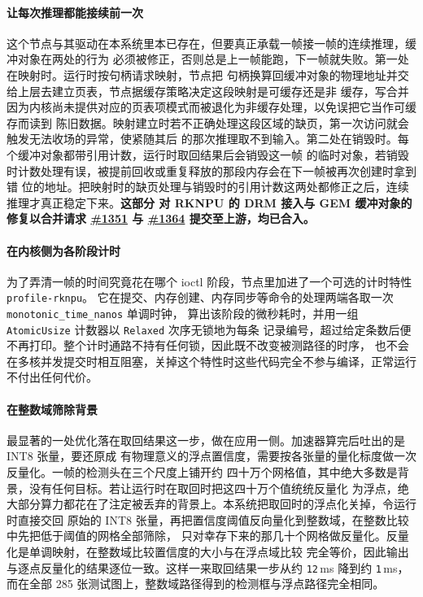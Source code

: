\paragraph{让每次推理都能接续前一次}
这个节点与其驱动在本系统里本已存在，但要真正承载一帧接一帧的连续推理，缓冲对象在两处的行为
必须被修正，否则总是上一帧能跑，下一帧就失败。第一处在映射时。运行时按句柄请求映射，节点把
句柄换算回缓冲对象的物理地址并交给上层去建立页表，节点据缓存策略决定这段映射是可缓存还是非
缓存，写合并因为内核尚未提供对应的页表项模式而被退化为非缓存处理，以免误把它当作可缓存而读到
陈旧数据。映射建立时若不正确处理这段区域的缺页，第一次访问就会触发无法收场的异常，使紧随其后
的那次推理取不到输入。第二处在销毁时。每个缓冲对象都带引用计数，运行时取回结果后会销毁这一帧
的临时对象，若销毁时计数处理有误，被提前回收或重复释放的那段内存会在下一帧被再次创建时拿到错
位的地址。把映射时的缺页处理与销毁时的引用计数这两处都修正之后，连续推理才真正稳定下来。\textbf{这部分
对 RKNPU 的 DRM 接入与 GEM 缓冲对象的修复以合并请求 \href{https://github.com/rcore-os/tgoskits/pull/1351}{\#1351}
与 \href{https://github.com/rcore-os/tgoskits/pull/1364}{\#1364} 提交至上游，均已合入。}

\paragraph{在内核侧为各阶段计时}
为了弄清一帧的时间究竟花在哪个 ioctl 阶段，节点里加进了一个可选的计时特性 \texttt{profile-rknpu}。
它在提交、内存创建、内存同步等命令的处理两端各取一次 \texttt{monotonic\_time\_nanos} 单调时钟，
算出该阶段的微秒耗时，并用一组 \texttt{AtomicUsize} 计数器以 \texttt{Relaxed} 次序无锁地为每条
记录编号，超过给定条数后便不再打印。整个计时通路不持有任何锁，因此既不改变被测路径的时序，
也不会在多核并发提交时相互阻塞，关掉这个特性时这些代码完全不参与编译，正常运行不付出任何代价。

\paragraph{在整数域筛除背景}
最显著的一处优化落在取回结果这一步，做在应用一侧。加速器算完后吐出的是 INT8 张量，要还原成
有物理意义的浮点置信度，需要按各张量的量化标度做一次反量化。一帧的检测头在三个尺度上铺开约
四十万个网格值，其中绝大多数是背景，没有任何目标。若让运行时在取回时把这四十万个值统统反量化
为浮点，绝大部分算力都花在了注定被丢弃的背景上。本系统把取回时的浮点化关掉，令运行时直接交回
原始的 INT8 张量，再把置信度阈值反向量化到整数域，在整数比较中先把低于阈值的网格全部筛除，
只对幸存下来的那几十个网格做反量化。反量化是单调映射，在整数域比较置信度的大小与在浮点域比较
完全等价，因此输出与逐点反量化的结果逐位一致。这样一来取回结果一步从约 \texttt{12}\,ms 降到约
\texttt{1}\,ms，而在全部 285 张测试图上，整数域路径得到的检测框与浮点路径完全相同。

